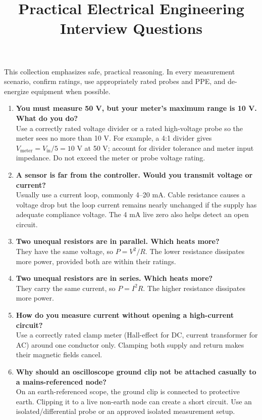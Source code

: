 \documentclass[11pt]{article}
\title{Practical Electrical Engineering Interview Questions}
\author{}
\date{}
\begin{document}
\maketitle
\noindent This collection emphasizes safe, practical reasoning. In every measurement scenario, confirm ratings, use appropriately rated probes and PPE, and de-energize equipment when possible.

\begin{enumerate}
\renewcommand{\labelenumi}{\textbf{\arabic{enumi}.}}
\setlength{\itemsep}{0.8em}
\item \textbf{You must measure 50 V, but your meter's maximum range is 10 V. What do you do?}\\
Use a correctly rated voltage divider or a rated high-voltage probe so the meter sees no more than 10 V. For example, a 4:1 divider gives $V_\mathrm{meter}=V_\mathrm{in}/5=10$ V at 50 V; account for divider tolerance and meter input impedance. Do not exceed the meter or probe voltage rating.

\item \textbf{A sensor is far from the controller. Would you transmit voltage or current?}\\
Usually use a current loop, commonly 4--20 mA. Cable resistance causes a voltage drop but the loop current remains nearly unchanged if the supply has adequate compliance voltage. The 4 mA live zero also helps detect an open circuit.

\item \textbf{Two unequal resistors are in parallel. Which heats more?}\\
They have the same voltage, so $P=V^2/R$. The lower resistance dissipates more power, provided both are within their ratings.

\item \textbf{Two unequal resistors are in series. Which heats more?}\\
They carry the same current, so $P=I^2R$. The higher resistance dissipates more power.

\item \textbf{How do you measure current without opening a high-current circuit?}\\
Use a correctly rated clamp meter (Hall-effect for DC, current transformer for AC) around one conductor only. Clamping both supply and return makes their magnetic fields cancel.

\item \textbf{Why should an oscilloscope ground clip not be attached casually to a mains-referenced node?}\\
On an earth-referenced scope, the ground clip is connected to protective earth. Clipping it to a live non-earth node can create a short circuit. Use an isolated/differential probe or an approved isolated measurement setup.


\end{enumerate}
\end{document}
